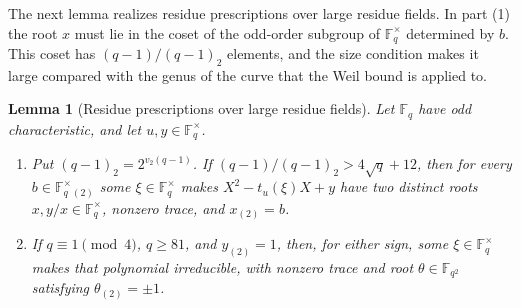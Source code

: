 \documentclass[11pt]{article}
\theoremstyle{plain}
\newtheorem{lemma}[theorem]{Lemma}
\theoremstyle{definition}
\theoremstyle{remark}
\newcommand{\F}{\mathbb F}
\begin{document}
The next lemma realizes residue prescriptions over large residue fields.
In part (1) the root $x$ must lie in the coset of the odd-order subgroup
of $\F_q^\times$ determined by $b$.  This coset has $(q-1)/(q-1)_2$
elements, and the size condition makes it large compared with the genus of
the curve that the Weil bound is applied to.

\begin{lemma}[Residue prescriptions over large residue fields]\label{lem:scaled-residues}
Let $\F_q$ have odd characteristic, and let $u,y\in\F_q^\times$.
\begin{enumerate}
\item Put $(q-1)_2=2^{v_2(q-1)}$.  If $(q-1)/(q-1)_2>4\sqrt q+12$, then for
every $b\in\F_q^\times{}_{(2)}$ some $\xi\in\F_q^\times$ makes
$X^2-t_u(\xi)X+y$ have two distinct roots $x,y/x\in\F_q^\times$, nonzero
trace, and $x_{(2)}=b$.
\item If $q\equiv1\pmod4$, $q\ge81$, and $y_{(2)}=1$, then, for either
sign, some $\xi\in\F_q^\times$ makes that polynomial
irreducible, with nonzero trace and root $\theta\in\F_{q^2}$ satisfying
$\theta_{(2)}=\pm1$.
\end{enumerate}
\end{lemma}
\end{document}
